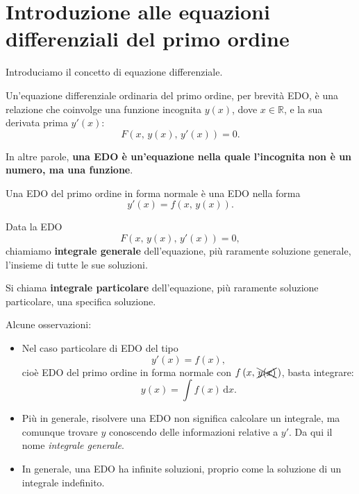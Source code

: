 \documentclass[../../analisi2]{subfiles}
\begin{document}
    \chapter{Introduzione alle equazioni differenziali del primo ordine}

        Introduciamo il concetto di equazione differenziale.

        \begin{definizione}
            Un'equazione differenziale ordinaria del primo ordine, per brevità EDO, è una relazione che coinvolge una funzione incognita
            \(y(x)\), dove \(x \in \mathbb{R}\), e la sua derivata prima \(y'(x)\):
            \[
                F\left(x, \, y(x), \, y'(x)\right) = 0.
            \]

            In altre parole, \textbf{una EDO è un'equazione nella quale l'incognita non è un numero, ma una funzione}.
        \end{definizione}

        \begin{definizione}
            Una EDO del primo ordine in forma normale è una EDO nella forma
            \[
                y'(x) = f\left(x, \, y(x)\right).
            \]
        \end{definizione}

        \begin{definizione}
            Data la EDO
            \[
                F\left(x, \, y(x), \, y'(x)\right) = 0,
            \]
            chiamiamo \textbf{integrale generale} dell'equazione, più raramente soluzione generale, l'insieme di tutte le sue soluzioni.

            Si chiama \textbf{integrale particolare} dell'equazione, più raramente soluzione particolare, una specifica soluzione.
        \end{definizione}

        Alcune osservazioni:
        \begin{itemize}
            \item Nel caso particolare di EDO del tipo
                \[
                    y'(x) = f(x),
                \]
                cioè EDO del primo ordine in forma normale con \(f\left(x, \, \xcancel{y(x)} \, \right)\), basta integrare:
                \[
                    y(x) = \int \! f(x) \, \mathrm{d}x.
                \]
            \item Più in generale, risolvere una EDO non significa calcolare un integrale, ma comunque trovare \(y\) conoscendo delle
                informazioni relative a \(y'\). Da qui il nome \emph{integrale generale}.
            \item In generale, una EDO ha infinite soluzioni, proprio come la soluzione di un integrale indefinito.
        \end{itemize}
            
\end{document}
